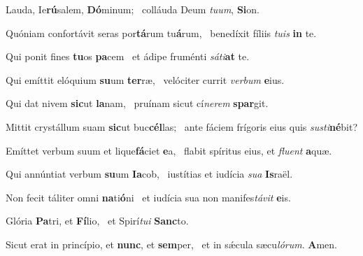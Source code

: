 \item Lauda, Ie\textbf{rú}salem, \textbf{Dó}minum;~\psstar{} colláuda Deum \textit{tuum}, \textbf{Si}on.

\item Quóniam confortávit seras por\textbf{tá}rum tu\textbf{á}rum,~\psstar{} benedíxit fíliis \textit{tuis} \textbf{in} te.

\item Qui ponit fines \textbf{tu}os \textbf{pa}cem~\psstar{} et ádipe fruménti \textit{sáti}\textbf{at} te.

\item Qui emíttit elóquium \textbf{su}um \textbf{ter}ræ,~\psstar{} velóciter currit \textit{verbum} \textbf{e}ius.

\item Qui dat nivem \textbf{sic}ut \textbf{la}nam,~\psstar{} pruínam sicut cí\textit{nerem} \textbf{spar}git.

\item Mittit crystállum suam \textbf{sic}ut buc\textbf{cél}las;~\psstar{} ante fáciem frígoris eius quis \textit{susti}\textbf{né}bit?

\item Emíttet verbum suum et lique\textbf{fá}ciet \textbf{e}a,~\psstar{} flabit spíritus eius, et \textit{fluent} \textbf{a}quæ.

\item Qui annúntiat verbum \textbf{su}um \textbf{Ia}cob,~\psstar{} iustítias et iudícia \textit{sua} \textbf{Is}raël.

\item Non fecit táliter omni \textbf{na}ti\textbf{ó}ni~\psstar{} et iudícia sua non manifes\textit{távit} \textbf{e}is.

\item Glória \textbf{Pa}tri, et \textbf{Fí}lio,~\psstar{} et Spirí\textit{tui} \textbf{Sanc}to.

\item Sicut erat in princípio, et \textbf{nunc}, et \textbf{sem}per,~\psstar{} et in sǽcula sæcu\textit{lórum}. \textbf{A}men.